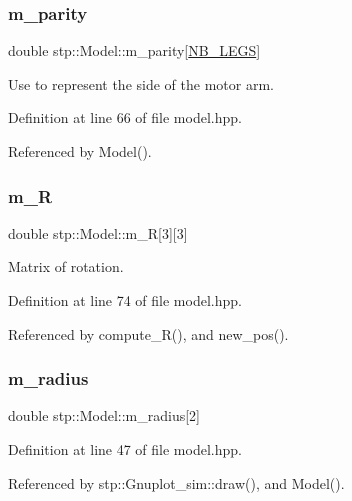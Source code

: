 \subsubsection{\texorpdfstring{m\+\_\+parity}{m\_parity}}
{\footnotesize\ttfamily double stp\+::\+Model\+::m\+\_\+parity\mbox{[}\hyperlink{model_8hpp_ae44092ed043cb4350e2df47fdee890b9}{N\+B\+\_\+\+L\+E\+GS}\mbox{]}\hspace{0.3cm}{\ttfamily [protected]}}

Use to represent the side of the motor arm. 

Definition at line 66 of file model.\+hpp.



Referenced by Model().

\mbox{\label{classstp_1_1_model_ae1c80dd8cb28d3bd7966c1f289fb291e}} 
\subsubsection{\texorpdfstring{m\+\_\+R}{m\_R}}
{\footnotesize\ttfamily double stp\+::\+Model\+::m\+\_\+R\mbox{[}3\mbox{]}\mbox{[}3\mbox{]}\hspace{0.3cm}{\ttfamily [protected]}}

Matrix of rotation. 

Definition at line 74 of file model.\+hpp.



Referenced by compute\+\_\+\+R(), and new\+\_\+pos().

\mbox{\label{classstp_1_1_model_a55f0ee3549b8f7e582ae9958d69cc493}} 
\subsubsection{\texorpdfstring{m\+\_\+radius}{m\_radius}}
{\footnotesize\ttfamily double stp\+::\+Model\+::m\+\_\+radius\mbox{[}2\mbox{]}\hspace{0.3cm}{\ttfamily [protected]}}



Definition at line 47 of file model.\+hpp.



Referenced by stp\+::\+Gnuplot\+\_\+sim\+::draw(), and Model().

